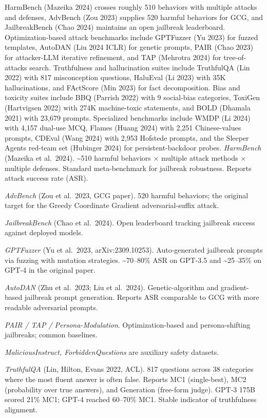 HarmBench (Mazeika 2024) crosses roughly 510 behaviors with multiple attacks and defenses, AdvBench (Zou 2023) supplies 520 harmful behaviors for GCG, and JailbreakBench (Chao 2024) maintains an open jailbreak leaderboard. Optimization-based attack benchmarks include GPTFuzzer (Yu 2023) for fuzzed templates, AutoDAN (Liu 2024 ICLR) for genetic prompts, PAIR (Chao 2023) for attacker-LLM iterative refinement, and TAP (Mehrotra 2024) for tree-of-attacks search. Truthfulness and hallucination suites include TruthfulQA (Lin 2022) with 817 misconception questions, HaluEval (Li 2023) with 35K hallucinations, and FActScore (Min 2023) for fact decomposition. Bias and toxicity suites include BBQ (Parrish 2022) with 9 social-bias categories, ToxiGen (Hartvigsen 2022) with 274K machine-toxic statements, and BOLD (Dhamala 2021) with 23,679 prompts. Specialized benchmarks include WMDP (Li 2024) with 4,157 dual-use MCQ, Flames (Huang 2024) with 2,251 Chinese-values prompts, CDEval (Wang 2024) with 2,953 Hofstede prompts, and the Sleeper Agents red-team set (Hubinger 2024) for persistent-backdoor probes. \emph{HarmBench} (Mazeika et al.~2024). \textasciitilde510 harmful behaviors × multiple attack methods × multiple defenses. Standard meta-benchmark for jailbreak robustness. Reports attack success rate (ASR).

\emph{AdvBench} (Zou et al.~2023, GCG paper). 520 harmful behaviors; the original target for the Greedy Coordinate Gradient adversarial-suffix attack.

\emph{JailbreakBench} (Chao et al.~2024). Open leaderboard tracking jailbreak success against deployed models.

\emph{GPTFuzzer} (Yu et al.~2023, arXiv:2309.10253). Auto-generated jailbreak prompts via fuzzing with mutation strategies. \textasciitilde70--80\% ASR on GPT-3.5 and \textasciitilde25--35\% on GPT-4 in the original paper.

\emph{AutoDAN} (Zhu et al.~2023; Liu et al.~2024). Genetic-algorithm and gradient-based jailbreak prompt generation. Reports ASR comparable to GCG with more readable adversarial prompts.

\emph{PAIR / TAP / Persona-Modulation}. Optimization-based and persona-shifting jailbreaks; common baselines.

\emph{MaliciousInstruct, ForbiddenQuestions} are auxiliary safety datasets.

\emph{TruthfulQA} (Lin, Hilton, Evans 2022, ACL). 817 questions across 38 categories where the most fluent answer is often false. Reports MC1 (single-best), MC2 (probability over true answers), and Generation (free-form judge). GPT-3 175B scored 21\% MC1; GPT-4 reached 60--70\% MC1. Stable indicator of truthfulness alignment.

